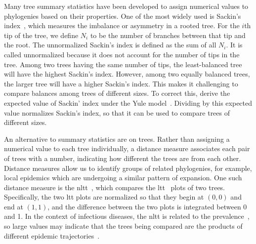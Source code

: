 Many tree summary statistics have been developed to assign numerical values to
phylogenies based on their properties. One of the most widely used is Sackin's
index~\cite{shao1990tree}, which measures the imbalance or asymmetry in a
rooted tree. For the $i$th tip of the tree, we define $N_i$ to be the number of
branches between that tip and the root. The unnormalized Sackin's index is
defined as the sum of all $N_i$. It is called unnormalized because it does not
account for the number of tips in the tree. Among two trees having the same
number of tips, the least-balanced tree will have the highest Sackin's index.
However, among two equally balanced trees, the larger tree will have a higher
Sackin's index. This makes it challenging to compare balances among trees of
different sizes. To correct this, \textcite{kirkpatrick1993searching} derive
the expected value of Sackin' index under the Yule
model~\autocite{yule1925mathematical}. Dividing by this expected value
normalizes Sackin's index, so that it can be used to compare trees of different
sizes.

An alternative to summary statistics are  on trees.
Rather than assigning a numerical value to each tree individually, a distance
measure associates each pair of trees with a number, indicating how different
the trees are from each other. Distance measures allow us to identify groups of
related phylogenies, for example, local epidemics which are undergoing a
similar pattern of expansion. One such distance measure is the
\gls{nltt}~\autocite{janzen2015approximate}, which compares the
\gls{ltt}~\autocite{nee1992tempo} plots of two trees. Specifically, the two
\gls{ltt} plots are normalized so that they begin at $(0, 0)$ and end at $(1,
1)$, and the difference between the two plots is integrated between 0 and 1.
In the context of infectious diseases, the \gls{nltt} is related to the
prevalence~\autocite{holmes1995revealing}, so large values may indicate that
the trees being compared are the products of different epidemic
trajectories~\autocite{janzen2015approximate}.

